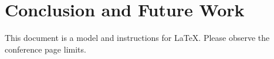\section{Conclusion and Future Work}
This document is a model and instructions for \LaTeX.
Please observe the conference page limits. 
